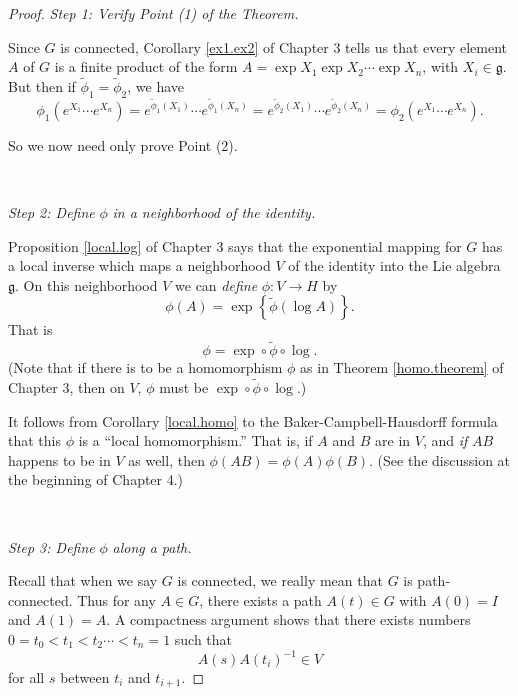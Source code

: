 \documentclass{amsbook}
\let \frak = \mathfrak
\theoremstyle{plain}
\numberwithin{equation}{chapter}
\numberwithin{theorem}{chapter}
\begin{document}
\begin{proof}
\textit{Step 1: Verify Point (1) of the Theorem.}

Since $G$ is connected, Corollary \ref{ex1.ex2} of Chapter 3 tells us that
every element $A$ of $G$ is a finite product of the form $A=\exp X_{1}\exp
X_{2}\cdots\exp X_{n}$, with $X_{i}\in\frak{g}$. But then if $\widetilde{\phi
}_{1}=\widetilde{\phi}_{2}$, we have
\[
\phi_{1}\left(  e^{X_{1}}\cdots e^{X_{n}}\right)  =e^{\widetilde{\phi}%
_{1}(X_{1})}\cdots e^{\widetilde{\phi}_{1}(X_{n})}=e^{\widetilde{\phi}%
_{2}(X_{1})}\cdots e^{\widetilde{\phi}_{2}(X_{n})}=\phi_{2}\left(  e^{X_{1}%
}\cdots e^{X_{n}}\right)  \text{.}%
\]

So we now need only prove Point (2).

\ 

\textit{Step 2: Define }$\phi$ \textit{in a neighborhood of the identity.}

Proposition \ref{local.log} of Chapter 3 says that the exponential mapping for
$G$ has a local inverse which maps a neighborhood $V$ of the identity into the
Lie algebra $\frak{g}$. On this neighborhood $V$ we can \textit{define}
$\phi:V\rightarrow H$ by
\[
\phi(A)=\exp\left\{  \widetilde{\phi}(\log A)\right\}  \text{.}%
\]
That is
\[
\phi=\exp\circ\widetilde{\phi}\circ\log\text{.}%
\]
(Note that if there is to be a homomorphism $\phi$ as in Theorem
\ref{homo.theorem} of Chapter 3, then on $V$, $\phi$ must be $\exp
\circ\widetilde{\phi}\circ\log$.)

It follows from Corollary \ref{local.homo} to the Baker-Campbell-Hausdorff
formula that this $\phi$ is a ``local homomorphism.'' That is, if $A$ and $B$
are in $V$, and \textit{if} $AB$ happens to be in $V$ as well, then
$\phi(AB)=\phi(A)\phi(B)$. (See the discussion at the beginning of Chapter 4.)

\ 

\textit{Step 3: Define }$\phi$ \textit{along a path.}

Recall that when we say $G$ is connected, we really mean that $G$ is
path-connected. Thus for any $A\in G$, there exists a path $A(t)\in G$ with
$A(0)=I$ and $A(1)=A$. A compactness argument shows that there exists numbers
$0=t_{0}<t_{1}<t_{2}\cdots<t_{n}=1$ such that
\begin{equation}
A(s)A(t_{i})^{-1}\in V\label{ratio}%
\end{equation}
for all $s$ between $t_{i}$ and $t_{i+1}$.


\end{proof}
\end{document}
